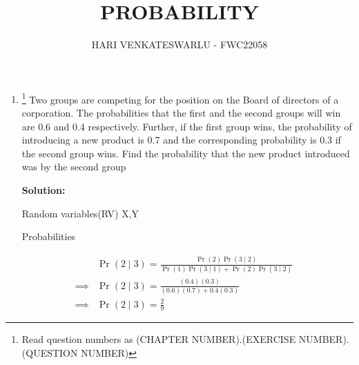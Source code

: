 \documentclass{article}
\providecommand{\pr}[1]{\ensuremath{\Pr\left(#1\right)}}
\newcommand{\solution}{\noindent \textbf{Solution: }}
\providecommand{\pr}[1]{\ensuremath{\Pr\left(#1\right)}}
\begin{document}
\title{PROBABILITY}
\author{\Large HARI VENKATESWARLU - FWC22058}
\date{}

\maketitle

\begin{enumerate}[label=13.\arabic{enumi}.\arabic{enumii}]%
\setcounter{enumi}{0}
\setcounter{enumii}{11}

\item \footnote{Read question numbers as (CHAPTER NUMBER).(EXERCISE NUMBER).(QUESTION NUMBER)} {Two groups are competing for the position
on the Board of directors of a corporation.
The probabilities that the first and the second
groups will win are 0.6 and 0.4 respectively.
Further, if the first group wins, the probability
of introducing a new product is 0.7 and the
corresponding probability is 0.3 if the second
group wins. Find the probability that the new
product introduced was by the second group}

	\solution\\
	\begin{table}[h]
	
	\caption{Random variables(RV) X,Y}%
\end{table}

    \begin{table}[h]
	
	\caption{Probabilities}%
    \end{table}
\begin{align}
&\pr{2 \mid 3} = \frac{\pr{2}\pr{3 \mid 2}}{\pr{1}\pr{3 \mid 1}+\pr{2}\pr{3 \mid 2}}&\\
\implies &\pr{2 \mid 3} = \frac{(0.4)(0.3)}{(0.6)(0.7)+0.4(0.3)}&\\
\implies &\pr{2 \mid 3} = \frac{2}{9}
\end{align}
\end{enumerate}
\end{document}
